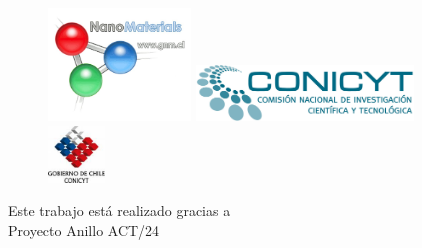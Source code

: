 \documentclass[a4paper,10pt]{scrbook}
\begin{document}
\vfill
\begin{center}
\begin{figure}[!hbt]\centering
\includegraphics[height=3cm]{gnm.jpg}\hskip2cm
\includegraphics[height=1.5cm]{conicyt.jpg}
\includegraphics[height=1.5cm]{gob-chile.jpeg}
\end{figure}
\end{center}
\begin{flushright}
 Este trabajo est\'a realizado gracias a\\
 Proyecto Anillo ACT/24
\end{flushright}



\newpage\pagestyle{empty}\tableofcontents\newpage
\pagestyle{fancy}
\newpage



\printindex
\end{document}
